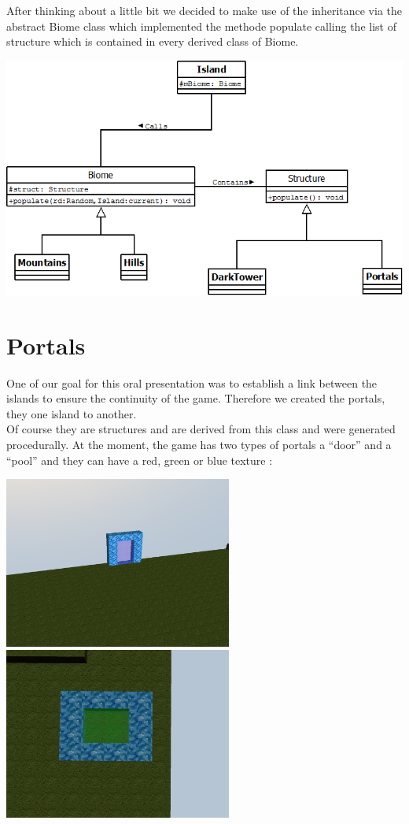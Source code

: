 \documentclass[article]{report}             %
\begin{document}
				After thinking about a little bit we decided to make use of the inheritance via the abstract Biome class which implemented the methode populate calling the list of structure which is contained in every derived class of Biome.
				\begin{center}
					\includegraphics[width=15cm]{images/Structures.png}
				\end{center}
				\newpage

			\section{Portals}
				One of our goal for this oral presentation was to establish a link between the islands to ensure the continuity of the game. Therefore we created the portals, they one island to another.\\

				Of course they are structures and are derived from this class and were generated procedurally. At the moment, the game has two types of portals a ``door'' and a ``pool'' and they can have a red, green or blue texture : 
				\begin{center}
					\includegraphics[width=7.5cm]{images/Portal1.png}
					\includegraphics[width=7.5cm]{images/Portal2.png}
				\end{center}
\end{document}
